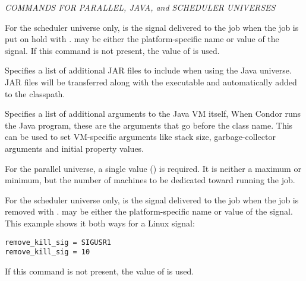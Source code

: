 \emph{COMMANDS FOR PARALLEL, JAVA, and SCHEDULER UNIVERSES}
\begin{description} 


\item[hold\_kill\_sig = $<$signal-number$>$] For the scheduler universe only,
 is the signal delivered
to the job when the job is put on hold
with .
 may be either the platform-specific name or value
of the signal.
If this command is not present,
the value of  is used.



\item[jar\_files = $<$file\_list$>$]
Specifies a list of additional JAR files to include when using
the Java universe.  JAR files will be transferred along with
the executable and automatically added to the classpath.


\item[java\_vm\_args = $<$argument\_list$>$]
Specifies a list of additional arguments to the Java VM itself,
When Condor runs the Java program, these are the arguments that 
go before the class name.  This can be used to set VM-specific 
arguments like stack size, garbage-collector arguments 
and initial property values.


\item[machine\_count = $<$max$>$] 
For the parallel universe,
a single value () is required.
It is neither a maximum or minimum, but 
the number of machines to be dedicated toward running the job.


\item[remove\_kill\_sig = $<$signal-number$>$] For the scheduler universe only,
 is the signal delivered
to the job when the job is removed
with .
 may be either the platform-specific name or value
of the signal.
This example shows it both ways for a Linux signal:
\begin{verbatim}
remove_kill_sig = SIGUSR1
remove_kill_sig = 10
\end{verbatim}
If this command is not present,
the value of  is used.

\end{description} 

